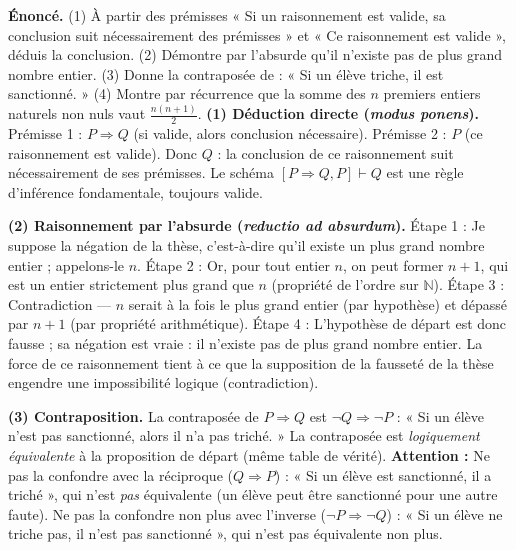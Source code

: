 \documentclass[11pt]{article}
\newcommand{\cle}[1]{{\popxbold\color{popdark}#1}}
\begin{document}
\begin{exoresolu}
\textbf{Énoncé.} (1) À partir des prémisses « Si un raisonnement est valide, sa conclusion suit nécessairement des prémisses » et « Ce raisonnement est valide », déduis la conclusion. (2) Démontre par l'absurde qu'il n'existe pas de plus grand nombre entier. (3) Donne la contraposée de : « Si un élève triche, il est sanctionné. » (4) Montre par récurrence que la somme des $n$ premiers entiers naturels non nuls vaut $\frac{n(n+1)}{2}$.
\tcblower
\textbf{(1) Déduction directe (\textit{modus ponens}).}
Prémisse 1 : $P \Rightarrow Q$ (si valide, alors conclusion nécessaire).
Prémisse 2 : $P$ (ce raisonnement est valide).
Donc $Q$ : la conclusion de ce raisonnement suit nécessairement de ses prémisses.
Le schéma $[P \Rightarrow Q, P] \vdash Q$ est une règle d'inférence fondamentale, toujours valide.

\textbf{(2) Raisonnement par l'absurde (\textit{reductio ad absurdum}).}
Étape 1 : Je suppose la négation de la thèse, c'est-à-dire qu'il existe un plus grand nombre entier ; appelons-le $n$.
Étape 2 : Or, pour tout entier $n$, on peut former $n + 1$, qui est un entier strictement plus grand que $n$ (propriété de l'ordre sur $\mathbb{N}$).
Étape 3 : Contradiction — $n$ serait à la fois le plus grand entier (par hypothèse) et dépassé par $n + 1$ (par propriété arithmétique).
Étape 4 : L'hypothèse de départ est donc fausse ; sa négation est vraie : il n'existe pas de plus grand nombre entier.
La force de ce raisonnement tient à ce que la supposition de la fausseté de la thèse engendre une impossibilité logique (contradiction).

\textbf{(3) Contraposition.}
La contraposée de $P \Rightarrow Q$ est $\neg Q \Rightarrow \neg P$ : « Si un élève n'est pas sanctionné, alors il n'a pas triché. »
La contraposée est \emph{logiquement équivalente} à la proposition de départ (même table de vérité).
\textbf{Attention :} Ne pas la confondre avec la \cle{réciproque} ($Q \Rightarrow P$) : « Si un élève est sanctionné, il a triché », qui n'est \emph{pas} équivalente (un élève peut être sanctionné pour une autre faute). Ne pas la confondre non plus avec l'\cle{inverse} ($\neg P \Rightarrow \neg Q$) : « Si un élève ne triche pas, il n'est pas sanctionné », qui n'est pas équivalente non plus.


\end{exoresolu}
\end{document}
